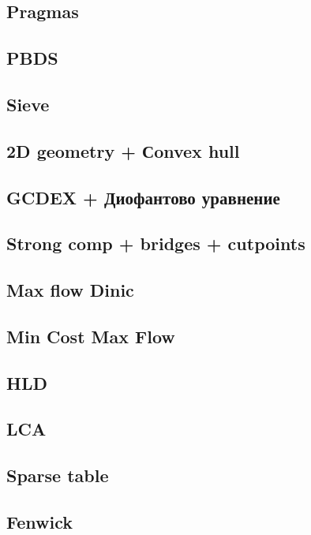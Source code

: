 \documentclass[10pt]{article}
\begin{document}
\begin{multicols}{2}
\subsection{Pragmas}

\subsection{PBDS}

\subsection{Sieve}

\subsection{2D geometry + Сonvex hull}

\subsection{GCDEX + Диофантово уравнение}

\subsection{Strong comp + bridges + cutpoints}

\subsection{Max flow Dinic}

\subsection{Min Cost Max Flow}

\subsection{HLD}

\subsection{LCA}

\subsection{Sparse table}

\subsection{Fenwick}


\end{multicols}
\end{document}

